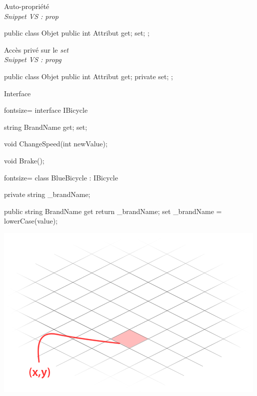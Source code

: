 \begin{frame}[fragile]
    \begin{center}
        {\large Auto-propriété}\\
        \emph{\scriptsize Snippet VS : prop}
    \end{center}
    \begin{csharpcode}
public class Objet
{
    public int Attribut { get; set; };
}
    \end{csharpcode}
    \pause
    \begin{center}
        {\large Accès privé sur le \emph{set}}\\
        \emph{\scriptsize Snippet VS : propg}
    \end{center}
    \begin{csharpcode}
public class Objet
{
    public int Attribut { get; private set; };
}
    \end{csharpcode}
\end{frame}

\begin{frame}[fragile]
    \begin{center}{\large Interface}\end{center}
    \begin{csharpcode*}{fontsize=\scriptsize}
interface IBicycle
{
     string BrandName { get; set; }

     void ChangeSpeed(int newValue);

     void Brake();
}
    \end{csharpcode*}
    \pause
    \begin{csharpcode*}{fontsize=\scriptsize}
class BlueBicycle : IBicycle
{
    private string _brandName;

    public string BrandName
    {
        get { return _brandName; }
        set { _brandName = lowerCase(value); }
    }
}
    \end{csharpcode*}
\end{frame}

\begingroup
{}
\begin{frame}
  \begin{center}
      \vspace{1.1cm}\includegraphics[scale=0.4]{img/map.png}
  \end{center}
\end{frame}

